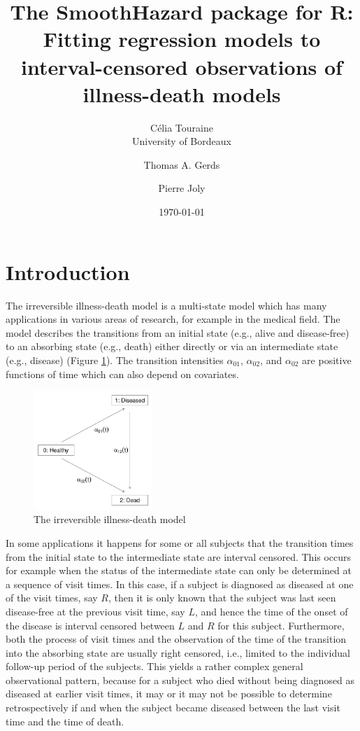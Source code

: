 \documentclass{article}
\author{C\'elia Touraine\\University of Bordeaux}
\affil{INSERM Epidemiology and Biostatistics Research Center,Bordeaux,France\\E-mail: celia.touraine@isped.u-bordeaux2.fr}
\author{Thomas A. Gerds}
\affil{Department of Biostatistics, University of Copenhagen, Denmark}
\author{Pierre Joly}
\affil{INSERM, Epidemiology and Biostatistics Research Center, Bordeaux, France}
\date{\today}
\title{The SmoothHazard package for R: Fitting regression models to interval-censored observations of illness-death models}
\begin{document}
\maketitle
\section{Introduction}
\label{sec-1}

The irreversible illness-death model is a multi-state model which has
many applications in various areas of research, for example in the
medical field. The model describes the transitions from an initial
state (e.g., alive and disease-free) to an absorbing state (e.g.,
death) either directly or via an intermediate state (e.g., disease)
(Figure \ref{fig:1}). The transition intensities $\alpha_{01}$,
$\alpha_{02}$, and $\alpha_{02}$ are positive functions of time which
can also depend on covariates.

\begin{figure}[htb]
\centering
\includegraphics[width=0.4\textwidth]{fig1.pdf}
\caption{\label{fig:1}The irreversible illness-death model}
\end{figure}

In some applications it happens for some or all subjects that the
transition times from the initial state to the intermediate state are
interval censored. This occurs for example when the status of the
intermediate state can only be determined at a sequence of visit
times. In this case, if a subject is diagnosed as diseased at one of
the visit times, say $R$, then it is only known that the subject was
last seen disease-free at the previous visit time, say $L$, and hence
the time of the onset of the disease is interval censored between $L$
and $R$ for this subject. Furthermore, both the process of visit times
and the observation of the time of the transition into the absorbing
state are usually right censored, i.e., limited to the individual
follow-up period of the subjects. This yields a rather complex general
observational pattern, because for a subject who died without being
diagnosed as diseased at earlier visit times, it may or it may not be
possible to determine retrospectively if and when the subject became
diseased between the last visit time and the time of death.
\end{document}
